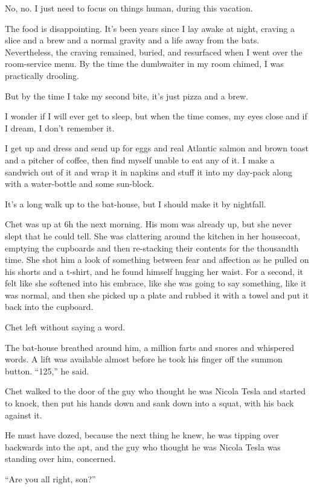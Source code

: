 No, no. I just need to focus on things human, during this
vacation.

The food is disappointing. It's been years since I lay awake at
night, craving a slice and a brew and a normal gravity and a life
away from the bats. Nevertheless, the craving remained, buried, and
resurfaced when I went over the room-service menu. By the time the
dumbwaiter in my room chimed, I was practically drooling.

But by the time I take my second bite, it's just pizza and a brew.

I wonder if I will ever get to sleep, but when the time comes, my
eyes close and if I dream, I don't remember it.

I get up and dress and send up for eggs and real Atlantic salmon
and brown toast and a pitcher of coffee, then find myself unable to
eat any of it. I make a sandwich out of it and wrap it in napkins
and stuff it into my day-pack along with a water-bottle and some
sun-block.

It's a long walk up to the bat-house, but I should make it by
nightfall.

\tb

Chet was up at 6h the next morning. His mom was already up, but she
never slept that he could tell. She was clattering around the
kitchen in her housecoat, emptying the cupboards and then
re-stacking their contents for the thousandth time. She shot him a
look of something between fear and affection as he pulled on his
shorts and a t-shirt, and he found himself hugging her waist. For a
second, it felt like she softened into his embrace, like she was
going to say something, like it was normal, and then she picked up
a plate and rubbed it with a towel and put it back into the
cupboard.

Chet left without saying a word.

The bat-house breathed around him, a million farts and snores and
whispered words. A lift was available almost before he took his
finger off the summon button. ``125,'' he said.

Chet walked to the door of the guy who thought he was Nicola Tesla
and started to knock, then put his hands down and sank down into a
squat, with his back against it.

He must have dozed, because the next thing he knew, he was tipping
over backwards into the apt, and the guy who thought he was Nicola
Tesla was standing over him, concerned.

``Are you all right, son?''

